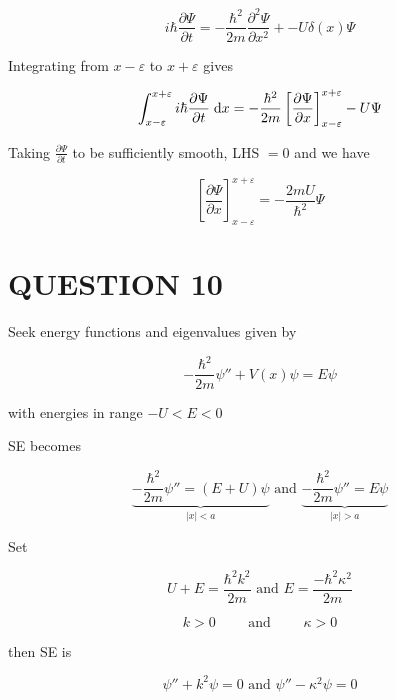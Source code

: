 \documentclass[a4paper]{article}
\begin{document}
\[ i \hbar \frac{\partial \Psi }{\partial t} = - \frac{\hbar^{2}}{2m} \frac{\partial^{2} \Psi }{\partial x^{2}} + -U \delta(x) \Psi \]

Integrating from $ x - \varepsilon $ to $  x + \varepsilon $ gives

\[ \int_{x-\varepsilon}^{x+\varepsilon}  i \hbar \frac{\partial \Psi }{\partial t} \; \mathrm{d} x= - \frac{\hbar^{2}}{2m} \left[ \frac{\partial \Psi }{\partial x} \right]_{x - \varepsilon}^{x + \varepsilon} -  U \Psi  \]

Taking $ \frac{\partial \Psi }{\partial t} $ to be sufficiently smooth, LHS $ = 0 $ and we have

\[  \left[ \frac{\partial \Psi }{\partial x} \right]_{x - \varepsilon}^{x + \varepsilon} = -  \frac{2mU }{\hbar^{2}}  \Psi   \]



\section{QUESTION 10}

	\begin{center}
\end{center}

Seek energy functions and eigenvalues given by

\[ -\frac{\hbar^{2}}{2m} \psi''  + V(x) \psi = E \psi \]

with energies in range $ -U < E < 0 $

SE becomes 

\[ \underbrace{-\frac{\hbar^{2}}{2m} \psi'' = (E+U) \psi}_{| x | < a} \text{ and } \underbrace{-\frac{\hbar^{2}}{2m} \psi'' = E \psi}_{| x | > a}  \]

Set 

\[ U + E = \frac{\hbar^{2}k^{2}}{2m} \text{ and } E = \frac{-\hbar^{2}\kappa^{2}}{2m}   \]

\[ k > 0 \qquad \text{ and } \qquad \kappa > 0 \]

then SE is 

\[ \psi''  + k^{2} \psi = 0 \text{ and } \psi'' - \kappa^{2} \psi = 0 \]
\end{document}
